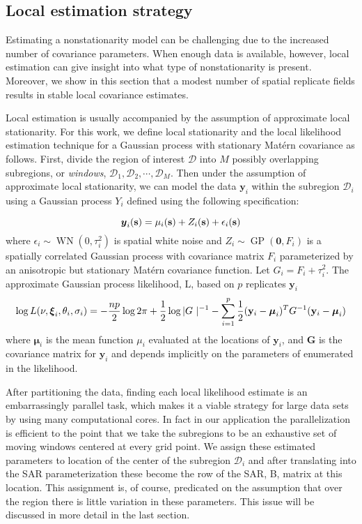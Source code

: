 \documentclass[review]{elsarticle}
\begin{document}
\subsection{Local estimation strategy}

Estimating a nonstationarity model can be challenging due to the increased number of covariance parameters. When enough data is available, however, local estimation can give insight into what type of nonstationarity is present. Moreover, we show in this section that a modest  number of spatial replicate fields results in stable local covariance estimates. 

Local estimation is usually accompanied by the assumption of approximate local stationarity. For this work, we define local stationarity and the local likelihood estimation technique for a Gaussian process with stationary Mat\'ern covariance as follows. First, divide the region of interest $\mathcal{D}$ into $M$ possibly overlapping subregions, or {\it windows},  $\mathcal{D}_1, \mathcal{D}_2, \cdots, \mathcal{D}_M$. Then under the assumption of approximate local stationarity, we can model the data $\mathbf y_i$ within the subregion $\mathcal{D}_i$ using a Gaussian process $Y_i$ defined using the following specification:

\begin{equation}
\label{e:4}
\mbox{\boldmath $y$}_i(\mathbf s) = \mu_i(\mathbf s) + Z_i (\mathbf s) + \epsilon_i (\mathbf s)    
\end{equation}
where $\epsilon_i \sim \operatorname{WN}(0, \tau_i^2)$ is spatial white noise and $Z_i \sim \operatorname{GP}( \mathbf 0, F_i)$ is a spatially correlated Gaussian process with covariance matrix $F_i$ parameterized by an anisotropic but  stationary Mat\'ern covariance function. Let $G_i = F_i + \tau_i^2$. The approximate Gaussian process likelihood, L,  based on  $p$ replicates $\mathbf y_i$ 
\begin{equation}
\label{e:5}
     \log L(\nu, \mbox{\boldmath $\xi$}_i, \theta_i,  \sigma_i)  = - \frac{n p}{2} \log 2 \pi + \frac{1}{2} \log | G \ |^{-1} - \sum_{i=1}^p \frac{1}{2}(\mathbf y_i - \boldsymbol \mu_i )^T G^{-1} (\mathbf y_i - \boldsymbol \mu_i)
\end{equation}
where $\boldsymbol{\mu}_i$ is the mean function $\mu_i$ evaluated at the locations of $\mathbf y_i$, and $\mathbf G$ is the covariance matrix for $\mathbf y_i$ and depends implicitly on the parameters of enumerated in the likelihood.  

After partitioning the data, finding each local likelihood estimate is an embarrassingly parallel task,
 which makes it a viable strategy for large data sets by using many computational cores. In fact in our application the parallelization is efficient to the point that we take  the subregions to be an exhaustive set of moving windows centered at every grid point. 
We assign these estimated parameters to  location of the center of the subregion $\mathcal{D}_i$ and
after translating into the SAR parameterization these become the row of the SAR, B, matrix at this location.  This  assignment is, of course, predicated on the assumption that over the region there is little variation in these parameters. This issue will be discussed in more detail in the last section. 
\end{document}
